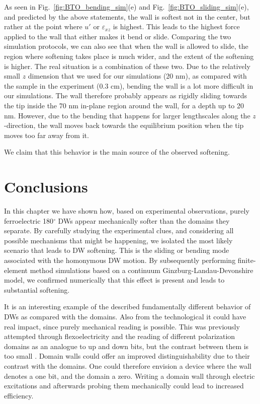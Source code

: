 As seen in Fig.~\ref{fig:BTO_bending_sim}(e) and Fig.~\ref{fig:BTO_sliding_sim}(e), and predicted by the above statements, the wall is softest not in the center, but rather at the point where $u'$ or $\varepsilon_{xz}$ is highest.
This leads to the highest force applied to the wall that either makes it bend or slide.
Comparing the two simulation protocols, we can also see that when the wall is allowed to slide, the region where softening takes place is much wider, and the extent of the softening is higher.
The real situation is a combination of these two. Due to the relatively small $z$ dimension that we used for our simulations (20 nm), as compared with the sample in the experiment (0.3 cm), bending the wall is a lot more difficult in our simulations.
The wall therefore probably appears as rigidly sliding towards the tip inside the 70 nm in-plane region around the wall, for a depth up to 20 nm.
However, due to the bending that happens for larger lengthscales along the $z$-direction, the wall moves back towards the equilibrium position when the tip moves too far away from it.

We claim that this behavior is the main source of the observed softening.


\section{Conclusions}
In this chapter we have shown how, based on experimental observations, purely ferroelectric 180$^\circ$ DWs appear mechanically softer than the domains they separate.
By carefully studying the experimental clues, and considering all possible mechanisms that might be happening, we isolated the most likely scenario that leads to DW softening.
This is the sliding or bending mode associated with the homonymous DW motion.
By subsequently performing finite-element method simulations based on a continuum Ginzburg-Landau-Devonshire model, we confirmed numerically that this effect is present and leads to substantial softening. 

It is an interesting example of the described fundamentally different behavior of DWs as compared with the domains.
Also from the technological it could have real impact, since purely mechanical reading is possible.
This was previously attempted through flexoelectricity and the reading of different polarization domains as an analogue to up and down bits, but the contrast between them is too small \cite{Cordero-Edwards2017}.
Domain walls could offer an improved distinguishability due to their contrast with the domains. One could therefore envision a device where the wall denotes a one bit, and the domain a zero. Writing a domain wall through electric excitations and afterwards probing them mechanically could lead to increased efficiency.

\printbibliography
